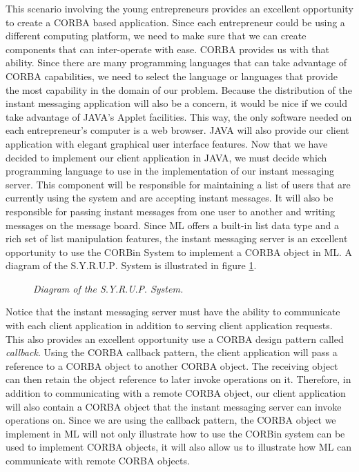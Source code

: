 This scenario involving the young entrepreneurs provides an excellent 
opportunity to create a CORBA based application.  Since each entrepreneur 
could be using a different computing platform, we need to make sure 
that we can create components that can inter-operate with ease.  CORBA 
provides us with that ability.  Since there are many programming languages 
that can take advantage of CORBA capabilities, we need to select the 
language or languages that provide the most capability in the domain of 
our problem.  Because the distribution of the instant messaging application
will also be a concern, it would be nice if we could take advantage of 
JAVA's Applet facilities.  This way, the only software needed on each 
entrepreneur's computer is a web browser.  JAVA will also provide 
our client application with elegant graphical user interface features. 
Now that we have decided to implement our client application in JAVA, 
we must decide which programming language to use in the implementation 
of our instant messaging server.  This component will be responsible 
for maintaining a list of users that are currently using the system 
and are accepting instant messages.  It will also be responsible for 
passing instant messages from one user to another and writing messages 
on the message board.    Since ML offers a built-in list data type and 
a rich set of list manipulation features, the instant messaging server 
is an excellent opportunity to use the CORBin System to implement a 
CORBA object in ML.  
A diagram of the S$.$Y$.$R$.$U$.$P$.$ System is illustrated in figure 
\ref{SyrupComponentDiagram}.  
\begin{figure}
\begin{center}
\leavevmode
\caption{\em{Diagram of the S$.$Y$.$R$.$U$.$P$.$ System}.}
\figline
         \label{SyrupComponentDiagram}
\end{center}
\end{figure}

Notice that the instant messaging server must have the ability to 
communicate with each client application in addition to serving 
client application requests.   This also provides an excellent 
opportunity use a CORBA design pattern called {\em{callback}}. 
Using the CORBA callback pattern, the client application will pass 
a reference to a CORBA object to another CORBA object.  The receiving 
object can then retain the object reference to later invoke 
operations on it. Therefore, in addition to communicating with a remote CORBA
object, our client application will also contain a CORBA object that the 
instant messaging server can invoke operations on.  
Since we are using the callback pattern, the CORBA object we implement in ML
will not only illustrate how to use the CORBin system can be used to 
implement CORBA objects, it will also allow us to illustrate how ML 
can communicate with remote CORBA objects.

